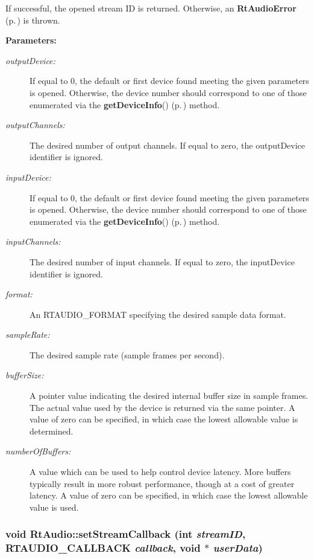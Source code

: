 If successful, the opened stream ID is returned. Otherwise, an {\bf Rt\-Audio\-Error} {\rm (p.\,\pageref{classRtAudioError})} is thrown.\begin{Desc}
\item[{\bf Parameters: }]\par
\begin{description}
\item[
{\em output\-Device:}]If equal to 0, the default or first device found meeting the given parameters is opened. Otherwise, the device number should correspond to one of those enumerated via the {\bf get\-Device\-Info}() {\rm (p.\,\pageref{classRtAudio_a7})} method. \item[
{\em output\-Channels:}]The desired number of output channels. If equal to zero, the output\-Device identifier is ignored. \item[
{\em input\-Device:}]If equal to 0, the default or first device found meeting the given parameters is opened. Otherwise, the device number should correspond to one of those enumerated via the {\bf get\-Device\-Info}() {\rm (p.\,\pageref{classRtAudio_a7})} method. \item[
{\em input\-Channels:}]The desired number of input channels. If equal to zero, the input\-Device identifier is ignored. \item[
{\em format:}]An RTAUDIO\_\-FORMAT specifying the desired sample data format. \item[
{\em sample\-Rate:}]The desired sample rate (sample frames per second). \item[
{\em buffer\-Size:}]A pointer value indicating the desired internal buffer size in sample frames. The actual value used by the device is returned via the same pointer. A value of zero can be specified, in which case the lowest allowable value is determined. \item[
{\em number\-Of\-Buffers:}]A value which can be used to help control device latency. More buffers typically result in more robust performance, though at a cost of greater latency. A value of zero can be specified, in which case the lowest allowable value is used. \end{description}
\end{Desc}
\subsubsection{\setlength{\rightskip}{0pt plus 5cm}void Rt\-Audio::set\-Stream\-Callback (int {\em stream\-ID}, {\bf RTAUDIO\_\-CALLBACK} {\em callback}, void $\ast$ {\em user\-Data})}\label{classRtAudio_a4}


